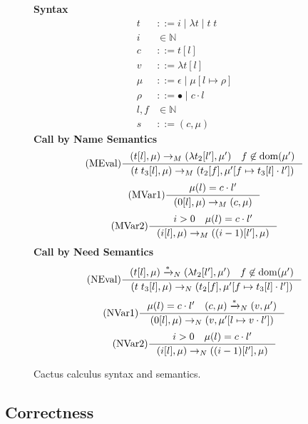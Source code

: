 \begin{figure*}
\textbf{Syntax}
\begin{align*}
\tag{Term} t &::= i \; | \; \lambda t \; | \; t \; t  \\
\tag{Variable} i &\in \mathbb{N}  \\
\tag{Closure} c &::= t [l] \\
\tag{Value} v &::= \lambda t [l] \\
\tag{Heap} \mu &::= \epsilon \; | \; \mu [ l \mapsto \rho ] \\
\tag{Environment} \rho &::= \bullet \; | \; c \cdot l \\
\tag{Location} l,f &\in \mathbb{N}  \\
\tag{State} s &::= (c, \mu)
\end{align*}
\textbf{Call by Name Semantics}
\begin{align*}
\tag{MEval} \inference
{(t[l], \mu) \rightarrow_{M} (\lambda t_2[l'], \mu') \quad f \not \in \textnormal{dom}(\mu')}
{(t \; t_3[l], \mu) \rightarrow_{M} (t_2[f], \mu'[f \mapsto t_3[l] \cdot l'])}  
\end{align*}
\begin{align*}
\tag{MVar1} \inference 
{\mu(l) = c \cdot l'}
{(0[l],\mu) \rightarrow_M (c,\mu)}
\end{align*}
\begin{align*}
\tag{MVar2} \inference
{i > 0 \quad \mu(l) = c \cdot l'}
{(i[l],\mu) \rightarrow_M ((i-1)[l'],\mu)}
\end{align*}
\textbf{Call by Need Semantics}
\begin{align*}
\tag{NEval} \inference
{(t[l], \mu) \xrightarrow{* }_{N} (\lambda t_2[l'], \mu') \quad f \not \in \textnormal{dom}(\mu')}
{(t \; t_3[l], \mu) \rightarrow_{N} (t_2[f], \mu'[f \mapsto t_3[l] \cdot l'])}  
\end{align*}
\begin{align*}
\tag{NVar1} \inference
{\mu(l) = c \cdot l' \quad (c, \mu) \xrightarrow{* }_{N} (v, \mu')}
{(0[l],\mu) \rightarrow_N (v, \mu'[l \mapsto v \cdot l'])}
\end{align*}
\begin{align*}
\tag{NVar2} \inference
{i > 0 \quad \mu(l) = c \cdot l'}
{(i[l],\mu) \rightarrow_N ((i-1)[l'], \mu)}
\end{align*}
\caption{Cactus calculus syntax and semantics.}
\label{fig:calccact}
\end{figure*}

\subsection{Correctness}

